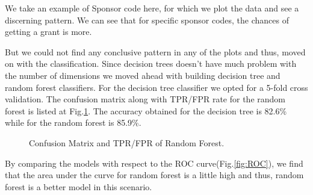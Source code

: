 \documentclass{article} %
\begin{document}
	We take an example of Sponsor code here, for which we plot the data and see a discerning pattern. We can see that for specific sponsor codes, the chances of getting a grant is more.
	
	But we could not find any conclusive pattern in any of the plots and thus, moved on with the classification. Since decision trees doesn't have much problem with the number of dimensions we moved ahead with building decision tree and random forest classifiers. For the decision tree classifier we opted for a 5-fold cross validation. The confusion matrix along with TPR/FPR rate for the random forest is listed at Fig.\ref{fig:RFCM}. The accuracy obtained for the decision tree is 82.6\% while for the random forest is 85.9\%.
	
	\begin{figure}[h]
		\begin{center}
		\end{center}
		\caption{Confusion Matrix and TPR/FPR of Random Forest.}
		\label{fig:RFCM}
	\end{figure}
	
	By comparing the models with respect to the ROC curve(Fig.\ref{fig:ROC}), we find that the area under the curve for random forest is a little high and thus, random forest is a better model in this scenario.
	
\end{document}
